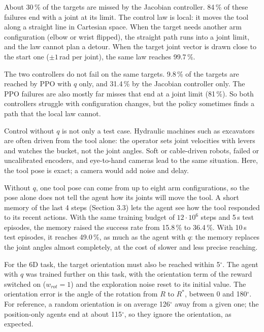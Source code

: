 \documentclass[10pt,a4paper]{article}
\newcommand{\sub}[1]{\vspace{1pt}{\bfseries #1}\par}
\begin{document}
\sub{5.2 Where each controller fails}
About 30\,\% of the targets are missed by the Jacobian controller.
84\,\% of these failures end with a joint at its limit.
The control law is local: it moves the tool along a straight line in Cartesian space.
When the target needs another arm configuration (elbow or wrist flipped), the straight path runs into a joint limit, and the law cannot plan a detour.
When the target joint vector is drawn close to the start one ($\pm 1$\,rad per joint), the same law reaches 99.7\,\%.

The two controllers do not fail on the same targets.
9.8\,\% of the targets are reached by PPO with $q$ only, and 31.4\,\% by the Jacobian controller only.
The PPO failures are also mostly far misses that end at a joint limit (81\,\%).
So both controllers struggle with configuration changes, but the policy sometimes finds a path that the local law cannot.

\sub{5.3 Without the joint angles}
Control without $q$ is not only a test case.
Hydraulic machines such as excavators are often driven from the tool alone: the operator sets joint velocities with levers and watches the bucket, not the joint angles.
Soft or cable-driven robots, failed or uncalibrated encoders, and eye-to-hand cameras lead to the same situation.
Here, the tool pose is exact; a camera would add noise and delay.

Without $q$, one tool pose can come from up to eight arm configurations, so the pose alone does not tell the agent how its joints will move the tool.
A short memory of the last 4 steps (Section 3.3) lets the agent see how the tool responded to its recent actions.
With the same training budget of $12\cdot10^6$ steps and 5\,s test episodes, the memory raised the success rate from 15.8\,\% to 36.4\,\%.
With 10\,s test episodes, it reaches 49.0\,\%, as much as the agent with $q$: the memory replaces the joint angles almost completely, at the cost of slower and less precise reaching.

\sub{5.4 Full pose task}
For the 6D task, the target orientation must also be reached within 5$^\circ$.
The agent with $q$ was trained further on this task, with the orientation term of the reward switched on ($w_{rot} = 1$) and the exploration noise reset to its initial value.
The orientation error is the angle of the rotation from $R$ to $R^*$, between 0 and 180$^\circ$.
For reference, a random orientation is on average 126$^\circ$ away from a given one; the position-only agents end at about 115$^\circ$, so they ignore the orientation, as expected.
\end{document}
